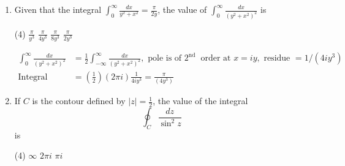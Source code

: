 \begin{enumerate}[label=\color{ocre}\textbf{\arabic*.}]
\begin{tasks}
		\task[\textbf{B.}]  $x^{2}-y^{2}$
		\task[\textbf{C.}] $x^{3}-3 x y^{2}$
		\task[\textbf{D.}] $3 x^{2} y-y-y^{3}$
	\end{tasks}
	\begin{answer}
		\begin{align*}
		\intertext{ Let $x^{2} y$ be real part of a complex function. Use Milne Thomson's method to write analytic complex function. The real part of that function should be (1) but that is not the case. So this cannot be real part of an analytic function. Also,}
		z^{2}&=(x+i y)^{2}=x^{2}-y^{2}+2 i x y,\text{ Real part option (2)}\\
		z^{3}&=(x+i y)^{3}=x^{3}-i y^{3}+3 i x y(x+i y)\\
		&=x^{3}-i y^{3}+3 i x^{2} y-3 x y^{2},\text{ Real part option (3)}
		\end{align*}
		So the correct answer is \textbf{Option (A)}
	\end{answer}
	\item  Given that the integral $\int_{0}^{\infty} \frac{d x}{y^{2}+x^{2}}=\frac{\pi}{2 y}$, the value of $\int_{0}^{\infty} \frac{d x}{\left(y^{2}+x^{2}\right)^{2}}$ is
	{}
	\begin{tasks}(4)
		\task[\textbf{A.}] $\frac{\pi}{y^{3}}$
		\task[\textbf{B.}] $\frac{\pi}{4 y^{3}}$
		\task[\textbf{C.}]  $\frac{\pi}{8 y^{3}}$
		\task[\textbf{D.}] $\frac{\pi}{2 y^{3}}$
	\end{tasks}
	\begin{answer}
		\begin{align*}
		\int_{0}^{\infty} \frac{d x}{\left(y^{2}+x^{2}\right)^{2}}&=\frac{1}{2} \int_{-\infty}^{\infty} \frac{d x}{\left(y^{2}+x^{2}\right)^{2}},\text{ pole is of }2^{\text {nd }}\text{ order at }x=i y,\text{ residue }=1 /\left(4 i y^{3}\right)\\
		\text{Integral }&=\left(\frac{1}{2}\right)(2 \pi i) \frac{1}{4 i y^{3}}=\frac{\pi}{\left(4 y^{3}\right)}
		\end{align*}
	\end{answer}
	\item If $C$ is the contour defined by $|z|=\frac{1}{2}$, the value of the integral
	$$
	\oint_{C} \frac{d z}{\sin ^{2} z}
	$$
	is
	{}
	\begin{tasks}(4)
		\task[\textbf{A.}] $\infty$
		\task[\textbf{B.}] $2 \pi i$
		\task[\textbf{D.}] $\pi i$
	\end{tasks}
	\begin{answer}
		\begin{align*}

\end{align*}
\end{answer}
\end{enumerate}

